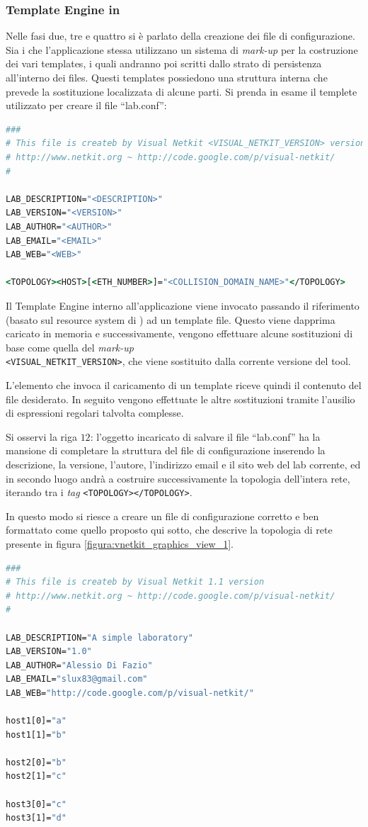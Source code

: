 \subsubsection*{Template Engine in \visualnetkit{}}
Nelle fasi due, tre e quattro si è parlato della creazione dei file di configurazione. Sia i \plugin{} che l'applicazione stessa utilizzano un sistema di \emph{mark-up} per la costruzione dei vari templates, i quali andranno poi scritti dallo strato di persistenza all'interno dei files. Questi templates possiedono una struttura interna che prevede la sostituzione localizzata di alcune parti. Si prenda in esame il templete utilizzato per creare il file ``lab.conf'':
\begin{lstlisting}[language=csh]
###
# This file is createb by Visual Netkit <VISUAL_NETKIT_VERSION> version
# http://www.netkit.org ~ http://code.google.com/p/visual-netkit/
#

LAB_DESCRIPTION="<DESCRIPTION>"
LAB_VERSION="<VERSION>"
LAB_AUTHOR="<AUTHOR>"
LAB_EMAIL="<EMAIL>"
LAB_WEB="<WEB>"

<TOPOLOGY><HOST>[<ETH_NUMBER>]="<COLLISION_DOMAIN_NAME>"</TOPOLOGY>
\end{lstlisting}
Il Template Engine interno all'applicazione viene invocato passando il riferimento (basato sul resource system di \qt{}) ad un template file. Questo viene dapprima caricato in memoria e successivamente, vengono effettuare alcune sostituzioni di base come quella del \emph{mark-up}\\
\texttt{<VISUAL\_{}NETKIT\_{}VERSION>}, che viene sostituito dalla corrente versione del tool.

L'elemento che invoca il caricamento di un template riceve quindi il contenuto del file desiderato. In seguito vengono effettuate le altre sostituzioni tramite l'ausilio di espressioni regolari talvolta complesse.

Si osservi la riga $12$: l'oggetto incaricato di salvare il file ``lab.conf'' ha la mansione di completare la struttura del file di configurazione inserendo la descrizione, la versione, l'autore, l'indirizzo email e il sito web del lab corrente, ed in secondo luogo andrà a costruire successivamente la topologia dell'intera rete, iterando tra i \emph{tag} \texttt{<TOPOLOGY></TOPOLOGY>}.

In questo modo si riesce a creare un file di configurazione corretto e ben formattato come quello proposto qui sotto, che descrive la topologia di rete presente in figura \ref{figura:vnetkit_graphics_view_1}.
\begin{lstlisting}[language=csh]
###
# This file is createb by Visual Netkit 1.1 version
# http://www.netkit.org ~ http://code.google.com/p/visual-netkit/
#

LAB_DESCRIPTION="A simple laboratory"
LAB_VERSION="1.0"
LAB_AUTHOR="Alessio Di Fazio"
LAB_EMAIL="slux83@gmail.com"
LAB_WEB="http://code.google.com/p/visual-netkit/"

host1[0]="a"
host1[1]="b"

host2[0]="b"
host2[1]="c"

host3[0]="c"
host3[1]="d"
\end{lstlisting}

